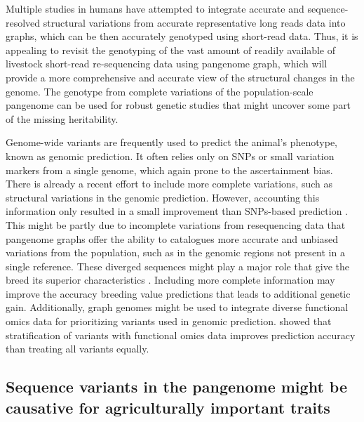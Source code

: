 \documentclass[../main.tex]{subfiles}
\begin{document}
Multiple studies in humans \citep{eggertsson2019graphtyper2,chen2019paragraph,hickey2020genotyping} have attempted to integrate accurate and sequence-resolved structural variations from accurate representative long reads data into graphs, which can be then accurately genotyped using short-read data. Thus, it is appealing to revisit the genotyping of the vast amount of readily available of livestock short-read re-sequencing data using pangenome graph, which will provide a more comprehensive and accurate view of the structural changes in the genome. The genotype from complete variations of the population-scale pangenome can be used for robust genetic studies that might uncover some part of the missing heritability.

Genome-wide variants are frequently used to predict the animal’s phenotype, known as genomic prediction. It often relies only on SNPs or small variation markers from a single genome, which again prone to the ascertainment bias. 
There is already a recent effort to include more complete variations, such as structural variations in the genomic prediction. However, accounting this information only resulted in a small improvement than SNPs-based prediction \citep{el2018genomic,chen2021investigating}. This might be partly due to incomplete variations from resequencing data that pangenome graphs offer the ability to catalogues more accurate and unbiased variations from the population, such as in the genomic regions not present in a single reference. These diverged sequences might play a major role that give the breed its superior characteristics \citep{Hu2020}. Including more complete information may improve the accuracy breeding value predictions that leads to additional genetic gain. Additionally, graph genomes might be used to integrate diverse functional omics data for prioritizing variants used in genomic prediction. \citet{macleod2016exploiting} showed that stratification of variants with functional omics data improves prediction accuracy than treating all variants equally. 


\subsection*{Sequence variants in the pangenome might be causative for agriculturally important traits}
\end{document}
